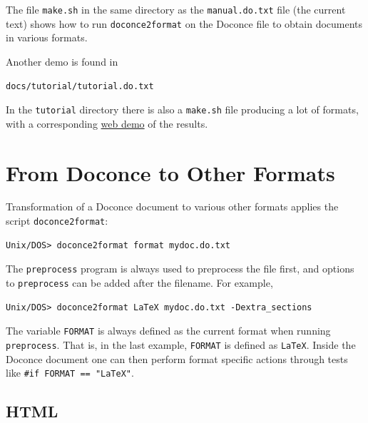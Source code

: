\documentclass{article}
\begin{document}
The file {\fontsize{10pt}{10pt}\verb!make.sh!} in the same directory as the {\fontsize{10pt}{10pt}\verb!manual.do.txt!} file
(the current text) shows how to run {\fontsize{10pt}{10pt}\verb!doconce2format!} on the
Doconce file to obtain documents in various formats.

Another demo is found in
\begin{Verbatim}[fontsize=\fontsize{9pt}{9pt},tabsize=8,baselinestretch=0.85,
fontfamily=tt,xleftmargin=7mm]
docs/tutorial/tutorial.do.txt
\end{Verbatim}
\noindent
In the {\fontsize{10pt}{10pt}\verb!tutorial!} directory there is also a {\fontsize{10pt}{10pt}\verb!make.sh!} file producing a
lot of formats, with a corresponding
\href{https://doconce.googlecode.com/hg/trunk/docs/demos/tutorial/index.html}{web demo}
of the results.



\section{From Doconce to Other Formats}

Transformation of a Doconce document to various other
formats applies the script {\fontsize{10pt}{10pt}\verb!doconce2format!}:
\begin{Verbatim}[fontsize=\fontsize{9pt}{9pt},tabsize=8,baselinestretch=0.85,
fontfamily=tt,xleftmargin=7mm]
Unix/DOS> doconce2format format mydoc.do.txt
\end{Verbatim}
\noindent
The {\fontsize{10pt}{10pt}\verb!preprocess!} program is always used to preprocess the file first,
and options to {\fontsize{10pt}{10pt}\verb!preprocess!} can be added after the filename. For example,
\begin{Verbatim}[fontsize=\fontsize{9pt}{9pt},tabsize=8,baselinestretch=0.85,
fontfamily=tt,xleftmargin=7mm]
Unix/DOS> doconce2format LaTeX mydoc.do.txt -Dextra_sections
\end{Verbatim}
\noindent
The variable {\fontsize{10pt}{10pt}\verb!FORMAT!} is always defined as the current format when
running {\fontsize{10pt}{10pt}\verb!preprocess!}. That is, in the last example, {\fontsize{10pt}{10pt}\verb!FORMAT!} is
defined as {\fontsize{10pt}{10pt}\verb!LaTeX!}. Inside the Doconce document one can then perform
format specific actions through tests like {\fontsize{10pt}{10pt}\verb!#if FORMAT == "LaTeX"!}.

\subsection{HTML}
\end{document}
